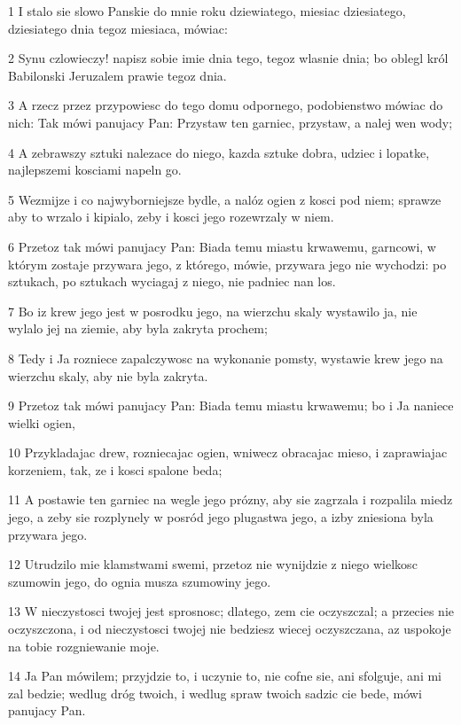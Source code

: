 \par 1 I stalo sie slowo Panskie do mnie roku dziewiatego, miesiac dziesiatego, dziesiatego dnia tegoz miesiaca, mówiac:
\par 2 Synu czlowieczy! napisz sobie imie dnia tego, tegoz wlasnie dnia; bo oblegl król Babilonski Jeruzalem prawie tegoz dnia.
\par 3 A rzecz przez przypowiesc do tego domu odpornego, podobienstwo mówiac do nich: Tak mówi panujacy Pan: Przystaw ten garniec, przystaw, a nalej wen wody;
\par 4 A zebrawszy sztuki nalezace do niego, kazda sztuke dobra, udziec i lopatke, najlepszemi kosciami napeln go.
\par 5 Wezmijze i co najwyborniejsze bydle, a nalóz ogien z kosci pod niem; sprawze aby to wrzalo i kipialo, zeby i kosci jego rozewrzaly w niem.
\par 6 Przetoz tak mówi panujacy Pan: Biada temu miastu krwawemu, garncowi, w którym zostaje przywara jego, z którego, mówie, przywara jego nie wychodzi: po sztukach, po sztukach wyciagaj z niego, nie padniec nan los.
\par 7 Bo iz krew jego jest w posrodku jego, na wierzchu skaly wystawilo ja, nie wylalo jej na ziemie, aby byla zakryta prochem;
\par 8 Tedy i Ja rozniece zapalczywosc na wykonanie pomsty, wystawie krew jego na wierzchu skaly, aby nie byla zakryta.
\par 9 Przetoz tak mówi panujacy Pan: Biada temu miastu krwawemu; bo i Ja naniece wielki ogien,
\par 10 Przykladajac drew, rozniecajac ogien, wniwecz obracajac mieso, i zaprawiajac korzeniem, tak, ze i kosci spalone beda;
\par 11 A postawie ten garniec na wegle jego prózny, aby sie zagrzala i rozpalila miedz jego, a zeby sie rozplynely w posród jego plugastwa jego, a izby zniesiona byla przywara jego.
\par 12 Utrudzilo mie klamstwami swemi, przetoz nie wynijdzie z niego wielkosc szumowin jego, do ognia musza szumowiny jego.
\par 13 W nieczystosci twojej jest sprosnosc; dlatego, zem cie oczyszczal; a przecies nie oczyszczona, i od nieczystosci twojej nie bedziesz wiecej oczyszczana, az uspokoje na tobie rozgniewanie moje.
\par 14 Ja Pan mówilem; przyjdzie to, i uczynie to, nie cofne sie, ani sfolguje, ani mi zal bedzie; wedlug dróg twoich, i wedlug spraw twoich sadzic cie bede, mówi panujacy Pan.
